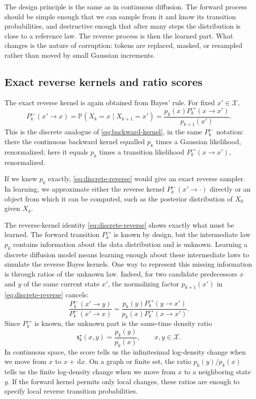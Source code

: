 \documentclass{amsart}
\numberwithin{equation}{section}
\theoremstyle{plain}
\theoremstyle{definition}
\theoremstyle{remark}
\newcommand{\Pp}{\mathbb{P}}
\newcommand{\dd}{\,\mathrm{d}}
\newcommand{\cX}{\mathcal{X}}
\newcommand{\sstar}{\mathsf{s}^{\star}}
\begin{document}
The design principle is the same as in continuous diffusion.  The
forward process should be simple enough that we can sample from it and know its
transition probabilities, and destructive enough that after many steps the
distribution is close to a reference law.  The reverse process is then the
learned part.  What changes is the nature of corruption: tokens are replaced,
masked, or resampled rather than moved by small Gaussian increments.


\subsection{Exact reverse kernels and ratio scores}

The exact reverse kernel is again obtained from Bayes' rule.  For fixed
$x'\in\cX$,
\begin{equation}\label{eq:discrete-reverse}
    P_k^{\leftarrow}(x' \to x)
    =
    \Pp(X_k=x\mid X_{k+1}=x')
    =
    \frac{p_k(x)P_k^{\to}(x \to x')}{p_{k+1}(x')}.
\end{equation}
This is the discrete analogue of \eqref{eq:backward-kernel}, in the same
$P_k^{\leftarrow}$ notation: there the continuous backward kernel equalled $p_k$
times a Gaussian likelihood, renormalized; here it equals $p_k$ times a
transition likelihood $P_k^{\to}(x \to x')$, renormalized.

If we knew $p_k$ exactly, \eqref{eq:discrete-reverse} would give an exact
reverse sampler.  In learning, we approximate either the reverse kernel
$P_k^{\leftarrow}(x' \to \cdot)$ directly or an object from which it can be computed,
such as the posterior distribution of $X_0$ given $X_k$.

The reverse-kernel identity \eqref{eq:discrete-reverse} shows exactly what must
be learned.  The forward transition $P_k^{\to}$ is known by design, but the
intermediate law $p_k$ contains information about the data distribution and is
unknown.  Learning a discrete diffusion model means learning enough about these
intermediate laws to simulate the reverse Bayes kernels.  One way to represent
this missing information is through ratios of the unknown law.  Indeed, for two
candidate predecessors $x$ and $y$ of the same current state $x'$, the
normalizing factor $p_{k+1}(x')$ in \eqref{eq:discrete-reverse} cancels:
\[
    \frac{P_k^{\leftarrow}(x' \to y)}{P_k^{\leftarrow}(x' \to x)}
    =
    \frac{p_k(y)P_k^{\to}(y \to x')}{p_k(x)P_k^{\to}(x \to x')}.
\]
Since $P_k^{\to}$ is known, the unknown part is the same-time density ratio
\begin{equation}\label{eq:discrete-ratio-score}
    \sstar_k(x,y)=\frac{p_k(y)}{p_k(x)},\qquad x,y\in\cX.
\end{equation}
In continuous space, the score tells us the infinitesimal log-density change
when we move from $x$ to $x+\dd x$.  On a graph or finite set, the ratio
$p_k(y)/p_k(x)$ tells us the finite log-density change when we move from
$x$ to a neighboring state $y$.  If the forward kernel permits only local
changes, these ratios are enough to specify local reverse transition
probabilities.
\end{document}
